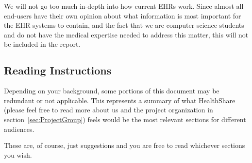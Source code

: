\documentclass[14pt]{article}
\begin{document}
We will not go too much in-depth into how current \glspl{EHR} work. Since almost all end-users have their own opinion about what information is most important for the \gls{EHR} systems to contain, and the fact that we are computer science students and do not have the medical expertise needed to address this matter, this will not be included in the report.



\subsection{Reading Instructions}
Depending on your background, some portions of this document may be redundant or not applicable. This represents a summary of what HealthShare (please feel free to read more about us and the project organization in section~\ref{sec:ProjectGroup}) feels would be the most relevant sections for different audiences.

These are, of course, just suggestions and you are free to read whichever sections you wish.
\end{document}
